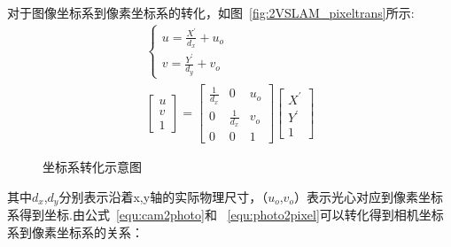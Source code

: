 对于图像坐标系到像素坐标系的转化，如图~\ref{fig:2VSLAM_pixeltrans}所示:
\begin{equation}
  \begin{split}
    \left\{\begin{array}{l}{u=\frac{X^{\prime}}{d_{x}}+u_{o}} \\ {v=\frac{Y^{\prime}}{d_{y}}+v_{o}}\end{array}\right.\\
    \left[\begin{array}{l}{u} \\ {v} \\ {1}\end{array}\right]=\left[\begin{array}{ccc}{\frac{1}{d_{x}}} & {0} & {u_{o}} \\ {0} & {\frac{1}{d_{x}}} & {v_{o}} \\ {0} & {0} & {1}\end{array}\right]\left[\begin{array}{c}{X^{\prime}} \\ {Y^{\prime}} \\ {1}\end{array}\right]
  \end{split}
  \label{equ:photo2pixel}
\end{equation}
\begin{figure}[H]
  \centering%
  \hspace{6em}%
  \caption{坐标系转化示意图}
  \label{fig:trans}
\end{figure}
其中$d_x$,$d_y$分别表示沿着x,y轴的实际物理尺寸，（$u_o$,$v_o$）表示光心对应到像素坐标系得到坐标.由公式~\ref{equ:cam2photo}和
~\ref{equ:photo2pixel}可以转化得到相机坐标系到像素坐标系的关系：
